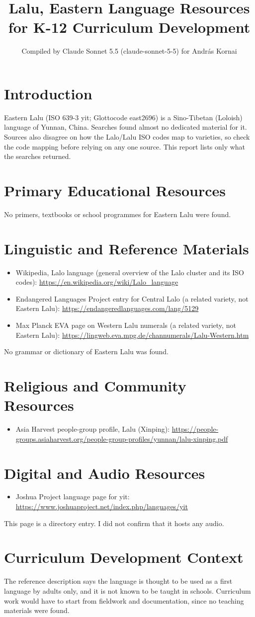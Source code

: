 \documentclass[12pt]{article}
\title{Lalu, Eastern Language Resources for K-12 Curriculum Development}
\author{Compiled by Claude Sonnet 5.5 (claude-sonnet-5-5) for Andr\'as Kornai}
\date{}
\begin{document}
\maketitle

\section{Introduction}
Eastern Lalu (ISO 639-3 yit; Glottocode east2696) is a Sino-Tibetan (Loloish) language of Yunnan, China. Searches found almost no dedicated material for it. Sources also disagree on how the Lalo/Lalu ISO codes map to varieties, so check the code mapping before relying on any one source. This report lists only what the searches returned.

\section{Primary Educational Resources}
No primers, textbooks or school programmes for Eastern Lalu were found.

\section{Linguistic and Reference Materials}
\begin{itemize}
\item Wikipedia, Lalo language (general overview of the Lalo cluster and its ISO codes): \url{https://en.wikipedia.org/wiki/Lalo_language}
\item Endangered Languages Project entry for Central Lalo (a related variety, not Eastern Lalu): \url{https://endangeredlanguages.com/lang/5129}
\item Max Planck EVA page on Western Lalu numerals (a related variety, not Eastern Lalu): \url{https://lingweb.eva.mpg.de/channumerals/Lalu-Western.htm}
\end{itemize}
No grammar or dictionary of Eastern Lalu was found.

\section{Religious and Community Resources}
\begin{itemize}
\item Asia Harvest people-group profile, Lalu (Xinping): \url{https://people-groups.asiaharvest.org/people-group-profiles/yunnan/lalu-xinping.pdf}
\end{itemize}

\section{Digital and Audio Resources}
\begin{itemize}
\item Joshua Project language page for yit: \url{https://www.joshuaproject.net/index.php/languages/yit}
\end{itemize}
This page is a directory entry. I did not confirm that it hosts any audio.

\section{Curriculum Development Context}
The reference description says the language is thought to be used as a first language by adults only, and it is not known to be taught in schools. Curriculum work would have to start from fieldwork and documentation, since no teaching materials were found.
\end{document}

